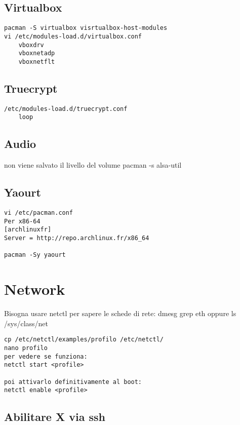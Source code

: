 \documentclass[]{article}
\begin{document}
\subsection{Virtualbox}\label{virtualbox}

\begin{verbatim}
pacman -S virtualbox visrtualbox-host-modules
vi /etc/modules-load.d/virtualbox.conf
    vboxdrv 
    vboxnetadp 
    vboxnetflt 
\end{verbatim}

\subsection{Truecrypt}\label{truecrypt}

\begin{verbatim}
/etc/modules-load.d/truecrypt.conf 
    loop
\end{verbatim}

\subsection{Audio}\label{audio}

non viene salvato il livello del volume pacman -s alsa-util

\subsection{Yaourt}\label{yaourt}

\begin{verbatim}
vi /etc/pacman.conf 
Per x86-64 
[archlinuxfr] 
Server = http://repo.archlinux.fr/x86_64 

pacman -Sy yaourt
\end{verbatim}

\section{Network}\label{network}

Bisogna usare netctl per sapere le schede di rete: dmesg \textbar{} grep
eth oppure ls /sys/class/net

\begin{verbatim}
cp /etc/netctl/examples/profilo /etc/netctl/
nano profilo
per vedere se funziona: 
netctl start <profile>

poi attivarlo definitivamente al boot: 
netctl enable <profile>
\end{verbatim}

\subsection{Abilitare X via ssh}\label{abilitare-x-via-ssh}
\end{document}
